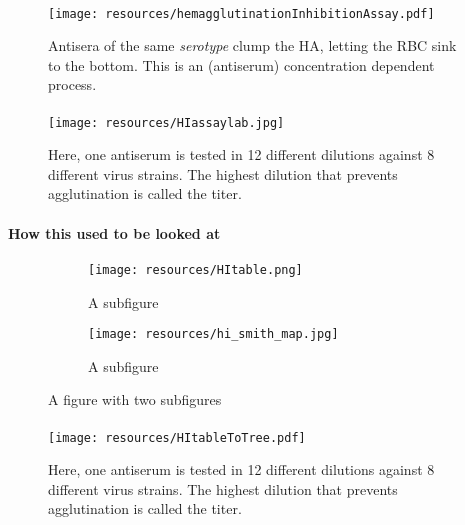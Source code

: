 \documentclass{beamer}
\begin{document}
\begin{darkframes}
    \begin{frame}{\subsecname}
      \framesubtitle{}
      \begin{figure}
        \texttt{[image: resources/hemagglutinationInhibitionAssay.pdf]}
        \caption{Antisera of the same \textit{serotype} clump the HA, letting the RBC sink to the bottom. This is an (antiserum) concentration dependent process.}
      \end{figure}
    \end{frame}

    \begin{frame}{\subsecname}
      \framesubtitle{}
      \begin{figure}
        \texttt{[image: resources/HIassaylab.jpg]}
        \caption{\footnotesize Here, one antiserum is tested in 12 different dilutions against 8 different virus strains. The highest dilution that prevents agglutination is called the titer.}
      \end{figure}
    \end{frame}

    \begin{frame}{\subsecname}
      \framesubtitle{How this used to be looked at}
      \begin{figure}
        \centering
        \begin{subfigure}{.5\textwidth}
          \centering
          \texttt{[image: resources/HItable.png]}
          \caption{A subfigure}
          \label{fig:sub1}
        \end{subfigure}%
        \begin{subfigure}{.5\textwidth}
          \centering
          \texttt{[image: resources/hi\_smith\_map.jpg]}
          \caption{A subfigure}
          \label{fig:sub2}
        \end{subfigure}
        \caption{A figure with two subfigures}
        \label{fig:test}
        \end{figure}
    \end{frame}

    \begin{frame}{\subsecname}
      \framesubtitle{}
      \begin{figure}
        \texttt{[image: resources/HItableToTree.pdf]}
        \caption{\footnotesize Here, one antiserum is tested in 12 different dilutions against 8 different virus strains. The highest dilution that prevents agglutination is called the titer.}
      \end{figure}
    \end{frame}


\end{darkframes}
\end{document}
